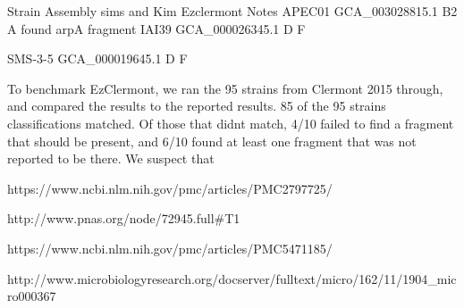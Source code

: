 Strain
Assembly
sims and Kim
Ezclermont
Notes
APEC01
GCA_003028815.1
B2
A
found arpA fragment
IAI39
GCA_000026345.1
D
F

SMS-3-5
GCA_000019645.1
D
F


To benchmark EzClermont, we ran the 95 strains from Clermont 2015 through, and compared the results to the reported results. 85 of the 95 strains classifications matched. Of those that didnt match, 4/10 failed to find a fragment that should be present, and 6/10 found at least one fragment that was not reported to be there.  We suspect that



https://www.ncbi.nlm.nih.gov/pmc/articles/PMC2797725/

http://www.pnas.org/node/72945.full#T1

https://www.ncbi.nlm.nih.gov/pmc/articles/PMC5471185/

http://www.microbiologyresearch.org/docserver/fulltext/micro/162/11/1904_micro000367
